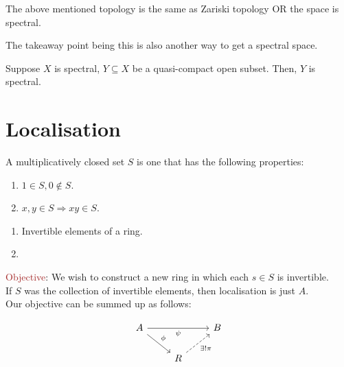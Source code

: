 \documentclass[oneside, 12pt]{scrbook}
\theoremstyle{theorem}
\begin{document}
\begin{proposition}
The above mentioned topology is the same as Zariski topology OR the space is spectral.
\end{proposition}

\begin{remark}
The takeaway point being this is also another way to get a spectral space.
\end{remark}

\begin{exercise}
Suppose $X$ is spectral, $Y\subseteq X$ be a quasi-compact open subset. Then, $Y$ is spectral.
\end{exercise}

\section{Localisation}

\begin{definition}
A multiplicatively closed set $S$ is one that has the following properties:
\begin{enumerate}
\item $1 \in S, 0 \not \in S$.
\item $x,y \in S \Rightarrow xy \in S$.
\end{enumerate}
\end{definition}

\begin{example}
\begin{enumerate}
\item Invertible elements of a ring.
\item 
\end{enumerate}
\end{example}

\textcolor{Brown}{Objective}: We wish to construct a new ring in which each $s\in S$ is invertible. \\

If $S$ was the collection of invertible elements, then localisation is just $A$. \\

Our objective can be summed up as follows: 

\[\begin{tikzcd}
	A && B \\
	& R
	\arrow["\psi"', from=1-1, to=1-3]
	\arrow["\phi", from=1-1, to=2-2]
	\arrow["{\exists ! \pi}"', dashed, from=2-2, to=1-3]
\end{tikzcd}\]
\end{document}
